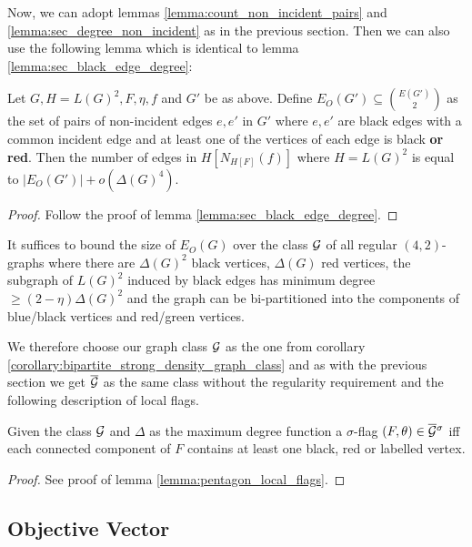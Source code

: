 Now, we can adopt lemmas \ref{lemma:count_non_incident_pairs} and
\ref{lemma:sec_degree_non_incident} as in the previous section.
Then we can also use the following lemma which is identical to lemma
\ref{lemma:sec_black_edge_degree}:
\begin{lemma}
    Let $G, H=L(G)^2, F, \eta, f$ and $G'$ be as above.
    Define $E_O(G') \subseteq \binom{E(G')}{2}$ as the set of pairs of non-incident
    edges $e, e'$ in $G'$
    where $e, e'$ are black edges with a common incident edge and
    at least one of the vertices of each edge is black \textbf{or red}.
    Then the number of edges in $H[N_{H[F]}(f)]$
    where $H=L(G)^2$ is equal to $|E_O(G')| + o(\Delta(G)^4)$.
\end{lemma}
\begin{proof}
    Follow the proof of lemma \ref{lemma:sec_black_edge_degree}.
\end{proof}
\begin{corollary}
    \label{corollary:bipartite_strong_density_graph_class}
    It suffices to bound the size of $E_O(G)$
    over the class $\mathcal{G}$ of all regular $(4,2)$-graphs where there are $\Delta(G)^2$ black
    vertices, $\Delta(G)$ red vertices, the subgraph of $L(G)^2$ induced by
    black edges has minimum degree $\geq (2-\eta)\Delta(G)^2$ and the graph can be
    bi-partitioned into the components of blue/black vertices and red/green vertices.
\end{corollary}

We therefore choose our graph class $\mathcal{G}$ as the one from
corollary \ref{corollary:bipartite_strong_density_graph_class} and as with the
previous section we get $\overline{\mathcal{G}}$ as the same class without the regularity requirement
and the following description of local flags.

\begin{lemma}
    Given the class $\mathcal{G}$ and $\Delta$ as the maximum degree function a
    $\sigma$-flag $(F,\theta)\in\overline{\mathcal{G}}{}^\sigma$ iff each connected component
    of $F$ contains at least one black, red or labelled vertex.
\end{lemma}
\begin{proof}
    See proof of lemma \ref{lemma:pentagon_local_flags}.
\end{proof}

\subsection{Objective Vector}
\label{sec:sec_bipartite_obj}

